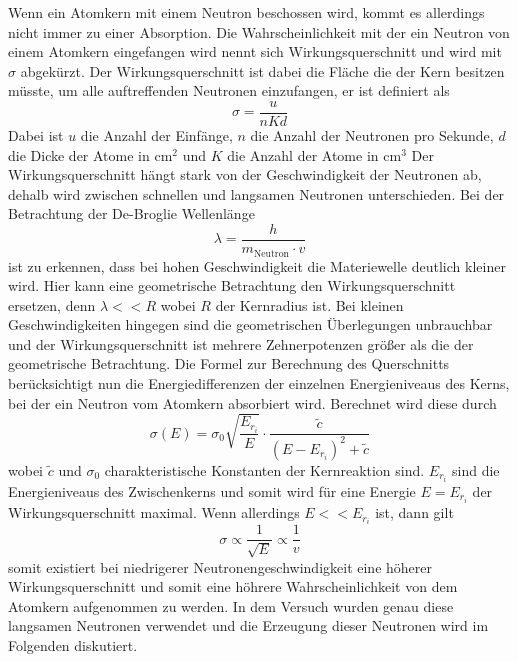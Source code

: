 Wenn ein Atomkern mit einem Neutron beschossen wird, kommt es allerdings nicht immer zu einer Absorption. Die Wahrscheinlichkeit mit der ein Neutron von einem Atomkern eingefangen wird nennt sich
Wirkungsquerschnitt und wird mit $\sigma$ abgekürzt.
Der Wirkungsquerschnitt ist dabei die Fläche die der Kern besitzen müsste, um alle auftreffenden Neutronen einzufangen, er ist definiert als
\begin{equation*}
\sigma = \frac{u}{nKd}
\end{equation*}
Dabei ist $u$ die Anzahl der Einfänge, $n$ die Anzahl der Neutronen pro Sekunde, $d$ die Dicke der Atome in $\si{\centi\meter\squared}$ und $K$ die Anzahl der Atome in $\si{\centi\meter\cubed}$
Der Wirkungsquerschnitt hängt stark von der Geschwindigkeit der Neutronen ab, dehalb wird zwischen schnellen und langsamen Neutronen unterschieden.
Bei der Betrachtung der De-Broglie Wellenlänge
\begin{equation*}
\lambda = \frac{h}{m_{\text{Neutron}} \cdot v} 
\end{equation*}
ist zu erkennen, dass bei hohen Geschwindigkeit die Materiewelle deutlich kleiner wird. Hier kann eine geometrische Betrachtung den Wirkungsquerschnitt ersetzen, denn $\lambda << R$ wobei $R$ der Kernradius ist.
Bei kleinen Geschwindigkeiten hingegen sind die geometrischen Überlegungen unbrauchbar und der Wirkungsquerschnitt ist mehrere Zehnerpotenzen größer als die der geometrische Betrachtung.
Die Formel zur Berechnung des Querschnitts berücksichtigt nun die Energiedifferenzen der einzelnen Energieniveaus des Kerns, bei der ein Neutron vom Atomkern absorbiert wird.
Berechnet wird diese durch
\begin{equation}
\sigma(E) = \sigma_{0} \sqrt{\frac{E_{r_{i}}}{E}} \cdot \frac{\tilde{c}}{(E - E_{r_{i}})^{2} + \tilde{c}}
\end{equation}
wobei $\tilde c$ und $\sigma_{0}$ charakteristische Konstanten der Kernreaktion sind. $E_{{r}_{i}}$ sind die Energieniveaus des Zwischenkerns und somit wird für eine Energie $E = E_{{r}_{i}}$
der Wirkungsquerschnitt maximal. Wenn allerdings $E << E_{{r}_{i}}$ ist, dann gilt
\begin{equation}
\sigma \propto \frac{1}{\sqrt{E}} \propto \frac{1}{v}
\end{equation}
somit existiert bei niedrigerer Neutronengeschwindigkeit eine höherer Wirkungsquerschnitt und somit eine höhrere Wahrscheinlichkeit von dem Atomkern aufgenommen zu werden.
In dem Versuch wurden genau diese langsamen Neutronen verwendet und die Erzeugung dieser Neutronen wird im Folgenden diskutiert.

